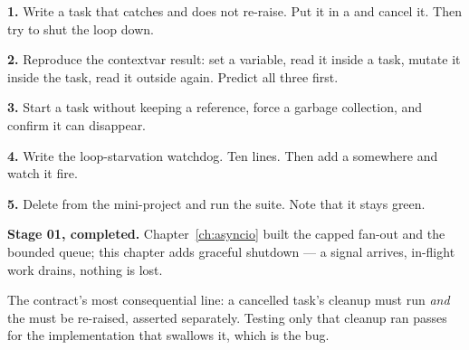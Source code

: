 \begin{exercisebox}
\textbf{1.} Write a task that catches  and does not re-raise.
Put it in a  and cancel it. Then try to shut the loop down.

\textbf{2.} Reproduce the contextvar result: set a variable, read it inside a
task, mutate it inside the task, read it outside again. Predict all three first.

\textbf{3.} Start a task without keeping a reference, force a garbage collection,
and confirm it can disappear.

\textbf{4.} Write the loop-starvation watchdog. Ten lines. Then add a
 somewhere and watch it fire.

\textbf{5.} Delete  from the mini-project and run
the suite. Note that it stays green.
\end{exercisebox}

\begin{projectbox}
\textbf{Stage 01, completed.} Chapter~\ref{ch:asyncio} built the capped fan-out
and the bounded queue; this chapter adds graceful shutdown --- a signal arrives,
in-flight work drains, nothing is lost.

The contract's most consequential line: a cancelled task's cleanup must run
\emph{and} the  must be re-raised, asserted separately.
Testing only that cleanup ran passes for the implementation that swallows it,
which is the bug.
\end{projectbox}
